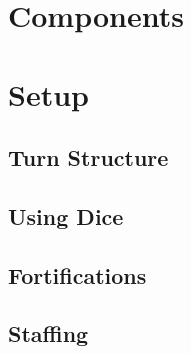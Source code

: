 \documentclass[12pt,a4paper,twocolumn,titlepage]{article}
\begin{document}
\begin{titlepage}
  
\end{titlepage}



\section{Components}
\label{sec:components}


\section{Setup}
\label{sec:setup}

% 

\subsection{Turn Structure}
\label{sec:turns}


\subsection{Using Dice}
\label{sec:dice}

% 

\subsection{Fortifications}
\label{sec:fortifications}

% 

% 

\subsection{Staffing}
\label{sec:components}

\end{document}

